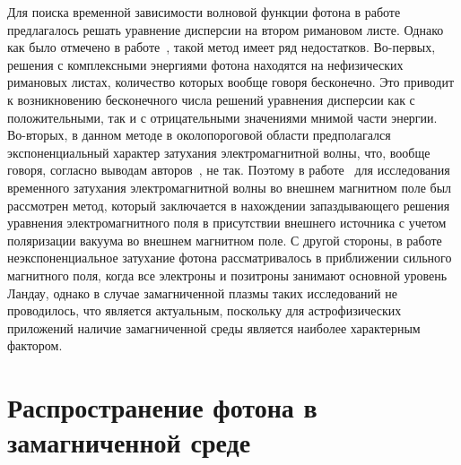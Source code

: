 \documentclass[14pt, russian]{article}
\begin{document}
Для поиска временной зависимости волновой функции фотона в работе~\cite{Shabad:1988} предлагалось решать уравнение дисперсии на втором римановом листе. Однако как было отмечено в работе~\cite{MikhChist:2001}, такой метод имеет ряд недостатков. Во-первых, решения с комплексными энергиями фотона находятся на нефизических римановых листах, количество которых вообще говоря бесконечно. Это приводит к возникновению бесконечного числа решений уравнения дисперсии как с положительными, так и с отрицательными значениями мнимой части энергии. Во-вторых, в данном методе в околопороговой области предполагался экспоненциальный характер затухания электромагнитной волны, что, вообще говоря, согласно выводам авторов~\cite{MikhChist:2001}, не так. Поэтому в работе~\cite{MikhChist:2001} для исследования временного затухания электромагнитной волны во внешнем магнитном поле был рассмотрен метод, который заключается в нахождении запаздывающего решения уравнения электромагнитного поля в присутствии внешнего источника с учетом поляризации вакуума во внешнем магнитном поле. С другой стороны, в работе~\cite{MikhChist:2001} неэкспоненциальное затухание фотона рассматривалось в приближении сильного магнитного поля, когда все электроны и позитроны занимают основной уровень Ландау, однако в случае замагниченной плазмы таких исследований не проводилось, что является актуальным, поскольку для астрофизических приложений наличие замагниченной среды является наиболее характерным фактором.

\section{Распространение фотона в замагниченной среде}
\end{document}
